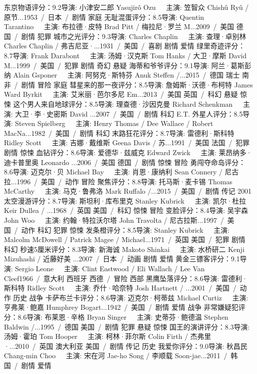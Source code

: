 东京物语评分：9.2导演: 小津安二郎 Yasujirô Ozu   主演: 笠智众 Chishû Ryû / 原节...1953 / 日本 / 剧情 家庭
无耻混蛋评分：8.5导演: Quentin Tarantino   主演: 布拉德·皮特 Brad Pitt / 梅拉尼·罗兰 M...2009 / 美国 德国 / 剧情 犯罪
城市之光评分：9.3导演: Charles Chaplin   主演: 查理·卓别林 Charles Chaplin / 弗吉尼亚·...1931 / 美国 / 喜剧 剧情 爱情
绿里奇迹评分：8.7导演: Frank Darabont   主演: 汤姆·汉克斯 Tom Hanks / 大卫·摩斯 David M...1999 / 美国 / 犯罪 剧情 奇幻 悬疑
海蒂和爷爷评分：9.1导演: 阿兰·葛斯彭纳 Alain Gsponer   主演: 阿努克·斯特芬 Anuk Steffen /...2015 / 德国 瑞士 南非 / 剧情 冒险 家庭
彗星来的那一夜评分：8.5导演: 詹姆斯·沃德·布柯特 James Ward Byrkit   主演: 艾米丽·芭尔多尼 Em...2013 / 美国 英国 / 科幻 悬疑 惊悚
这个男人来自地球评分：8.5导演: 理查德·沙因克曼 Richard Schenkman   主演: 大卫·李·史密斯 David ...2007 / 美国 / 剧情 科幻
E.T. 外星人评分：8.5导演: Steven Spielberg   主演: Henry Thomas / Dee Wallace / Robert MacNa...1982 / 美国 / 剧情 科幻
末路狂花评分：8.7导演: 雷德利·斯科特 Ridley Scott   主演: 吉娜·戴维斯 Geena Davis / 苏...1991 / 美国 法国 / 犯罪 剧情 惊悚
血钻评分：8.6导演: 爱德华·兹威克 Edward Zwick   主演: 莱昂纳多·迪卡普里奥 Leonardo ...2006 / 美国 德国 / 剧情 惊悚 冒险
勇闯夺命岛评分：8.6导演: 迈克尔·贝 Michael Bay   主演: 肖恩·康纳利 Sean Connery / 尼古拉...1996 / 美国 / 动作 冒险
聚焦评分：8.8导演: 托马斯·麦卡锡 Thomas McCarthy   主演: 马克·鲁弗洛 Mark Ruffalo /...2015 / 美国 / 剧情 传记
2001太空漫游评分：8.7导演: 斯坦利·库布里克 Stanley Kubrick   主演: 凯尔·杜拉 Keir Dullea / ...1968 / 英国 美国 / 科幻 惊悚 冒险
变脸评分：8.4导演: 吴宇森 John Woo   主演: 约翰·特拉沃尔塔 John Travolta / 尼古拉斯...1997 / 美国 / 动作 科幻 犯罪 惊悚
发条橙评分：8.5导演: Stanley Kubrick   主演: Malcolm McDowell / Patrick Magee / Michael...1971 / 英国 美国 / 犯罪 剧情 科幻
秒速5厘米评分：8.3导演: 新海诚 Makoto Shinkai   主演: 水桥研二 Kenji Mizuhashi / 近藤好美 ...2007 / 日本 / 动画 剧情 爱情
黄金三镖客评分：9.1导演: Sergio Leone   主演: Clint Eastwood / Eli Wallach / Lee Van Cleef1966 / 意大利 西班牙 西德 / 冒险 西部
黑鹰坠落评分：8.6导演: 雷德利·斯科特 Ridley Scott   主演: 乔什·哈奈特 Josh Hartnett / ...2001 / 美国 / 动作 历史 战争
卡萨布兰卡评分：8.6导演: 迈克尔·柯蒂兹 Michael Curtiz   主演: 亨弗莱·鲍嘉 Humphrey Bogart...1942 / 美国 / 剧情 爱情 战争
非常嫌疑犯评分：8.6导演: 布莱恩·辛格 Bryan Singer   主演: 史蒂芬·鲍德温 Stephen Baldwin /...1995 / 德国 美国 / 剧情 犯罪 悬疑 惊悚
国王的演讲评分：8.3导演: 汤姆·霍珀 Tom Hooper   主演: 柯林·菲尔斯 Colin Firth / 杰弗里·...2010 / 英国 澳大利亚 美国 / 剧情 传记 历史
我爱你评分：9.0导演: 秋昌民 Chang-min Choo   主演: 宋在河 Jae-ho Song / 李顺载 Soon-jae...2011 / 韩国 / 剧情 爱情
